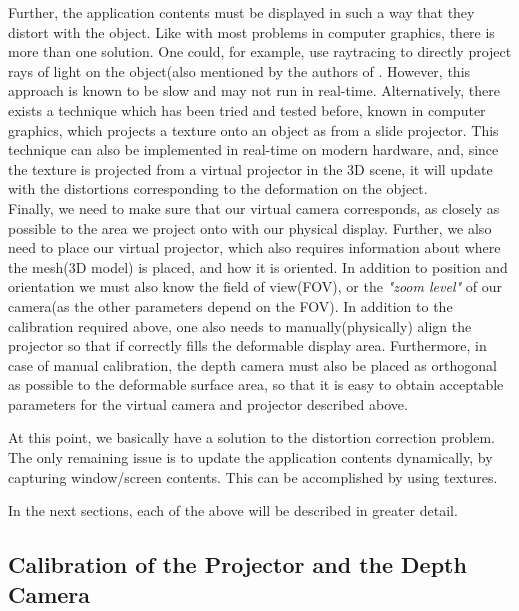 \documentclass[]{article}
\begin{document}
Further, the application contents must be displayed in such a way that they distort with the object. Like with most problems in computer graphics, there is more than one solution. One could, for example, use raytracing to directly project rays of light on the object(also mentioned by the authors of \cite{raskar98}. However, this approach is known to be slow and may not run in real-time. Alternatively, there exists a technique which has been tried and tested before, known in computer graphics, which projects a texture onto an object as from a slide projector. This technique can also be implemented in real-time on modern hardware, and, since the texture is projected from a virtual projector in the 3D scene, it will update with the distortions corresponding to the deformation on the object.\\

Finally, we need to make sure that our virtual camera corresponds, as closely as possible to the area we project onto with our physical display. Further, we also need to place our virtual projector, which also requires information about where the mesh(3D model) is placed, and how it is oriented. In addition to position and orientation we must also know the field of view(FOV), or the \textit{"zoom level"} of our camera(as the other parameters depend on the FOV). In addition to the calibration required above, one also needs to manually(physically) align the projector so that if correctly fills the deformable display area. Furthermore, in case of manual calibration, the depth camera must also be placed as orthogonal as possible to the deformable surface area, so that it is easy to obtain acceptable parameters for the virtual camera and projector described above. 

At this point, we basically have a solution to the distortion correction problem. The only remaining issue is to update the application contents dynamically, by capturing window/screen contents. This can be accomplished by using textures.

In the next sections, each of the above will be described in greater detail.

\subsection{Calibration of the Projector and the Depth Camera}
\end{document}
